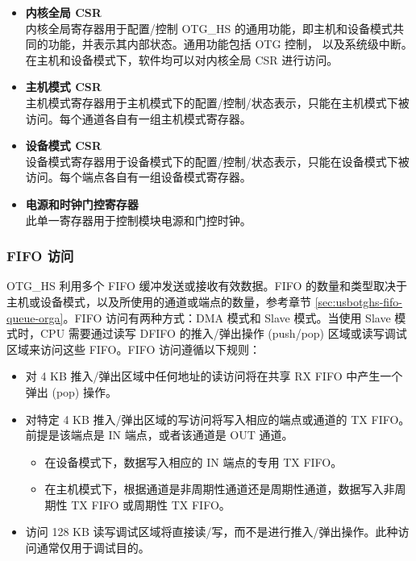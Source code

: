 \documentclass[main\_\_CN.tex]{subfiles}
\begin{document}
\begin{itemize}
    \item {\bfseries 内核全局 CSR}\\
    内核全局寄存器用于配置/控制 OTG\_HS 的通用功能，即主机和设备模式共同的功能，并表示其内部状态。通用功能包括 OTG 控制， 以及系统级中断。在主机和设备模式下，软件均可以对内核全局 CSR 进行访问。

    \item {\bfseries 主机模式 CSR}\\
    主机模式寄存器用于主机模式下的配置/控制/状态表示，只能在主机模式下被访问。每个通道各自有一组主机模式寄存器。

    \item {\bfseries 设备模式 CSR}\\
    设备模式寄存器用于设备模式下的配置/控制/状态表示，只能在设备模式下被访问。每个端点各自有一组设备模式寄存器。

    \item {\bfseries 电源和时钟门控寄存器}\\
    此单一寄存器用于控制模块电源和门控时钟。
\end{itemize}

\subsubsection{FIFO 访问}

OTG\_HS 利用多个 FIFO 缓冲发送或接收有效数据。FIFO 的数量和类型取决于主机或设备模式，以及所使用的通道或端点的数量，参考章节 \ref{sec:usbotghs-fifo-queue-orga}。FIFO 访问有两种方式：DMA 模式和 Slave 模式。当使用 Slave 模式时，CPU 需要通过读写 DFIFO 的推入/弹出操作 (push/pop) 区域或读写调试区域来访问这些 FIFO。FIFO 访问遵循以下规则：

\begin{itemize}
\item 对 4 KB 推入/弹出区域中任何地址的读访问将在共享 RX FIFO 中产生一个弹出 (pop) 操作。
\item 对特定 4 KB 推入/弹出区域的写访问将写入相应的端点或通道的 TX FIFO。前提是该端点是 IN 端点，或者该通道是 OUT 通道。
\begin{itemize}
\item 在设备模式下，数据写入相应的 IN 端点的专用 TX FIFO。
\item 在主机模式下，根据通道是非周期性通道还是周期性通道，数据写入非周期性 TX FIFO 或周期性 TX FIFO。
\end{itemize}
\item 访问 128 KB 读写调试区域将直接读/写，而不是进行推入/弹出操作。此种访问通常仅用于调试目的。
\end{itemize}
\end{document}
